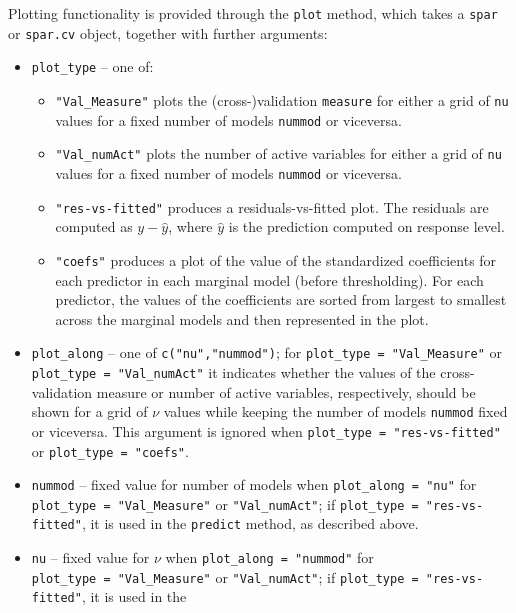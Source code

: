 \documentclass[
  article]{jss}
\begin{document}
Plotting functionality is provided through the \texttt{plot} method,
which takes a \texttt{spar} or \texttt{spar.cv} object, together with
further arguments:

\begin{itemize}
\item
  \texttt{plot\_type} -- one of:

  \begin{itemize}
  \item
    \texttt{"Val\_Measure"} plots the (cross-)validation
    \texttt{measure} for either a grid of \texttt{nu} values for a fixed
    number of models \texttt{nummod} or viceversa.
  \item
    \texttt{"Val\_numAct"} plots the number of active variables for
    either a grid of \texttt{nu} values for a fixed number of models
    \texttt{nummod} or viceversa.
  \item
    \texttt{"res-vs-fitted"} produces a residuals-vs-fitted plot. The
    residuals are computed as \(y- \widehat y\), where \(\widehat y\) is
    the prediction computed on response level.
  \item
    \texttt{"coefs"} produces a plot of the value of the standardized
    coefficients for each predictor in each marginal model (before
    thresholding). For each predictor, the values of the coefficients
    are sorted from largest to smallest across the marginal models and
    then represented in the plot.
  \end{itemize}
\item
  \texttt{plot\_along} -- one of \texttt{c("nu","nummod")}; for
  \texttt{plot\_type\ =\ "Val\_Measure"} or
  \texttt{plot\_type\ =\ "Val\_numAct"} it indicates whether the values
  of the cross-validation measure or number of active variables,
  respectively, should be shown for a grid of \(\nu\) values while
  keeping the number of models \texttt{nummod} fixed or viceversa. This
  argument is ignored when \texttt{plot\_type\ =\ "res-vs-fitted"} or
  \texttt{plot\_type\ =\ "coefs"}.
\item
  \texttt{nummod} -- fixed value for number of models when
  \texttt{plot\_along\ =\ "nu"} for
  \texttt{plot\_type\ =\ "Val\_Measure"} or \texttt{"Val\_numAct"}; if
  \texttt{plot\_type\ =\ "res-vs-fitted"}, it is used in the
  \texttt{predict} method, as described above.
\item
  \texttt{nu} -- fixed value for \(\nu\) when
  \texttt{plot\_along\ =\ "nummod"} for
  \texttt{plot\_type\ =\ "Val\_Measure"} or \texttt{"Val\_numAct"}; if
  \texttt{plot\_type\ =\ "res-vs-fitted"}, it is used in the

\end{itemize}
\end{document}
